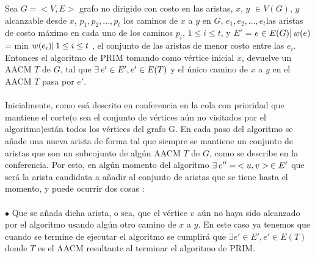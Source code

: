 \documentclass{article}
\begin{document}
    Sea $G = <V,E>$ grafo no dirigido con costo en las aristas, $x$, $y$ $\in V(G)$, $y$ alcanzable desde $x$, \textbraceleft$p_1, p_2,..., p_t$\textbraceright 
    los caminos de $x$ a $y$ en $G$, \textbraceleft$e_1, e_2,..., e_t$\textbraceright las aristas de costo m\'aximo en cada uno de los caminos $p_i$, $1 \leq i \leq t$, y
    $E'$ = \textbraceleft $e \in E(G) |\hspace{0.2em} w(e)$ = min \textbraceleft $w(e_i) |\hspace{0.2em} 1 \leq i \leq t$ \textbraceright \textbraceright, el conjunto
    de las aristas de menor costo entre las $e_i$. Entonces el algoritmo de PRIM tomando como v\'ertice inicial $x$, devuelve un AACM $T$ de $G$, tal que $\exists\hspace{0.2em}
    e' \in E', e' \in E(T)$ y el \'unico camino de $x$ a $y$ en el AACM $T$ pasa por $e'$.\\\\
    
    Inicialmente, como es\'a descrito en conferencia en la cola con prioridad que mantiene el corte(o sea el conjunto de v\'ertices a\'un no visitados por el algoritmo)est\'an todos los 
    v\'ertices del grafo G. En cada paso del algoritmo se a\~nade una nueva arista de forma tal que siempre se mantiene un conjunto de aristas que son un subcojunto de alg\'un AACM $T$ de $G$,
    como se describe en la conferencia. Por esto, en alg\'un momento del algoritmo $\exists\hspace{0.2em} e'' = \hspace{0.2em}<u,v>\hspace{0.2em} \in E'$ que ser\'a la arista candidata a 
    a\~nadir al conjunto de aristas que se tiene hasta el momento, y puede ocurrir dos cosas :\\\\
    
    $\bullet$ Que se a\~nada dicha arista, o sea, que el v\'ertice $v$ a\'un no haya sido alcanzado por el algoritmo usando alg\'un otro camino de $x$ a $y$. En este caso ya tenemos que cuando 
    se termine de ejecutar el algoritmo se cumplir\'a que $\exists e' \in E', e' \in E(T)$ donde $T$ es el AACM resultante al terminar el algoritmo de PRIM.\\\\
\end{document}
